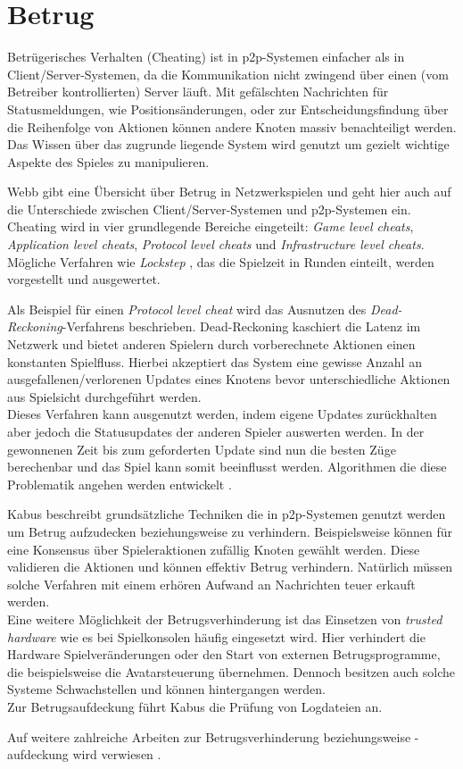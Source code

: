 \section{Betrug}
\label{chap:grundlagen:cheating}
Betrügerisches Verhalten (Cheating) ist in p2p-Systemen einfacher als in Client/Server-Systemen, da die Kommunikation nicht zwingend über einen (vom Betreiber kontrollierten) Server läuft. Mit gefälschten Nachrichten für Statusmeldungen, wie Positionsänderungen, oder zur Entscheidungsfindung über die Reihenfolge von Aktionen können andere Knoten massiv benachteiligt werden. Das Wissen über das zugrunde liegende System wird genutzt um gezielt wichtige Aspekte des Spieles zu manipulieren.

Webb \cite{Webb2007Cheating} gibt eine Übersicht über Betrug in Netzwerkspielen und geht hier auch auf die Unterschiede zwischen Client/Server-Systemen und p2p-Systemen ein. Cheating wird in vier grundlegende Bereiche eingeteilt: \emph{Game level cheats}, \emph{Application level cheats}, \emph{Protocol level cheats} und \emph{Infrastructure level cheats}. Mögliche Verfahren wie \emph{Lockstep} \cite{Baughman2007}, das die Spielzeit in Runden einteilt, werden vorgestellt und ausgewertet.

Als Beispiel für einen \emph{Protocol level cheat} wird das Ausnutzen des \emph{Dead-Reckoning}-Verfahrens \cite{Pantel2002} beschrieben. Dead-Reckoning kaschiert die Latenz im Netzwerk und bietet anderen Spielern durch vorberechnete Aktionen einen konstanten Spielfluss. Hierbei akzeptiert das System eine gewisse Anzahl an ausgefallenen/verlorenen Updates eines Knotens bevor unterschiedliche Aktionen aus Spielsicht durchgeführt werden.\\
Dieses Verfahren kann ausgenutzt werden, indem eigene Updates zurückhalten aber jedoch die Statusupdates der anderen Spieler auswerten werden. In der gewonnenen Zeit bis zum geforderten Update sind nun die besten Züge berechenbar und das Spiel kann somit beeinflusst werden. Algorithmen die diese Problematik angehen werden entwickelt \cite{Aggarwal2005}.

Kabus \cite{Kabus2005Addressing} beschreibt grundsätzliche Techniken die in p2p-Systemen genutzt werden um Betrug aufzudecken beziehungsweise zu verhindern. Beispielsweise können für eine Konsensus über Spieleraktionen zufällig Knoten gewählt werden. Diese validieren die Aktionen und können effektiv Betrug verhindern. Natürlich müssen solche Verfahren mit einem erhören Aufwand an Nachrichten teuer erkauft werden.\\
Eine weitere Möglichkeit der Betrugsverhinderung ist das Einsetzen von \emph{trusted hardware} wie es bei Spielkonsolen häufig eingesetzt wird. Hier verhindert die Hardware Spielveränderungen oder den Start von externen Betrugsprogramme, die beispielsweise die Avatarsteuerung übernehmen. Dennoch besitzen auch solche Systeme Schwachstellen und können hintergangen werden.\\
Zur Betrugsaufdeckung führt Kabus die Prüfung von Logdateien an.

Auf weitere zahlreiche Arbeiten zur Betrugsverhinderung beziehungsweise -aufdeckung wird verwiesen \cite{Ferretti2008Cheating, Gauthierdickey2004Low, Kabus2007Design, Dautermann2007, Kabus2009}.
